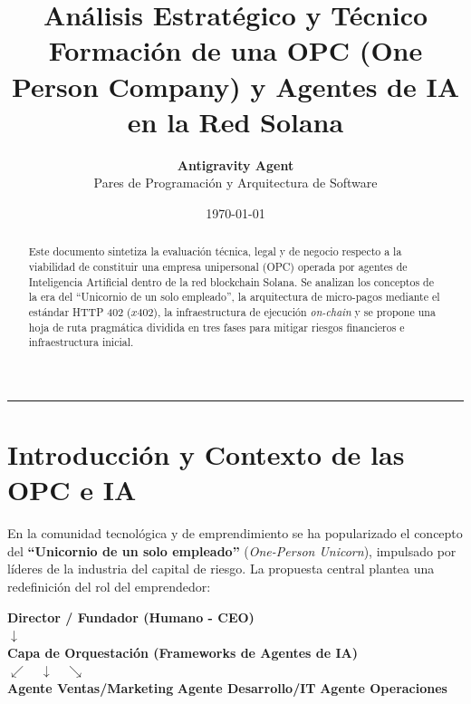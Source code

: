 \documentclass[11pt,a4paper]{article}
\title{\textbf{\huge Análisis Estratégico y Técnico}\\[0.3em]
\Large Formación de una OPC (One Person Company) y Agentes de IA en la Red Solana}
\author{\textbf{Antigravity Agent} \\ Pares de Programación y Arquitectura de Software}
\date{\today}
\begin{document}
\maketitle

\begin{abstract}
Este documento sintetiza la evaluación técnica, legal y de negocio respecto a la viabilidad de constituir una empresa unipersonal (OPC) operada por agentes de Inteligencia Artificial dentro de la red blockchain Solana. Se analizan los conceptos de la era del ``Unicornio de un solo empleado'', la arquitectura de micro-pagos mediante el estándar HTTP 402 ($x402$), la infraestructura de ejecución \emph{on-chain} y se propone una hoja de ruta pragmática dividida en tres fases para mitigar riesgos financieros e infraestructura inicial.
\end{abstract}

\vspace{0.5em}
\hrule
\vspace{1.5em}

\section{Introducción y Contexto de las OPC e IA}

En la comunidad tecnológica y de emprendimiento se ha popularizado el concepto del \textbf{``Unicornio de un solo empleado''} (\emph{One-Person Unicorn}), impulsado por líderes de la industria del capital de riesgo. La propuesta central plantea una redefinición del rol del emprendedor:

\begin{center}
\begin{tcolorbox}[title=Estructura Jerárquica del Modelo OPC + IA, width=0.9\textwidth]
\centering
\textbf{Director / Fundador (Humano - CEO)} \\
$\downarrow$ \\
\textbf{Capa de Orquestación (Frameworks de Agentes de IA)} \\
$\swarrow \quad \downarrow \quad \searrow$ \\
\small \textbf{Agente Ventas/Marketing} \quad \textbf{Agente Desarrollo/IT} \quad \textbf{Agente Operaciones}
\end{tcolorbox}
\end{center}
\end{document}
